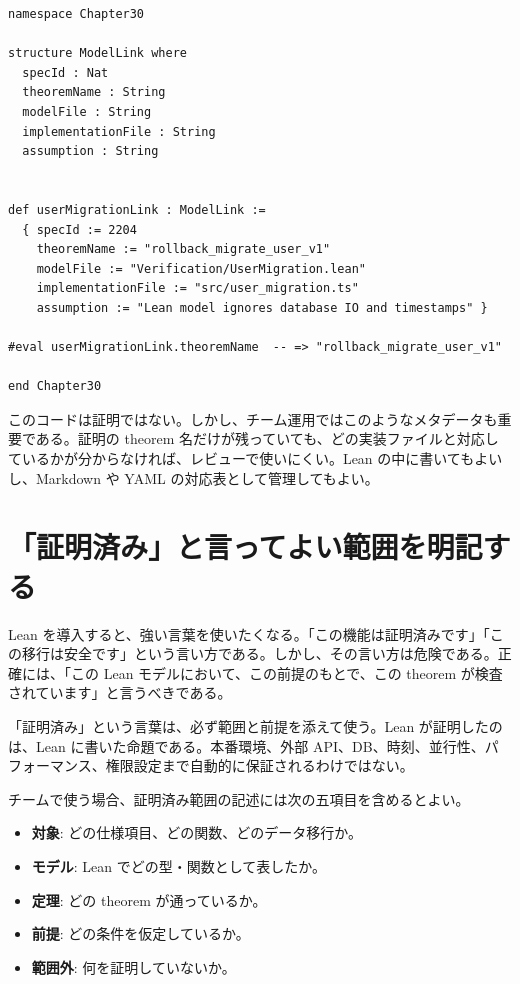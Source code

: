 \begin{listing}[htbp]
\begin{verbatim}
namespace Chapter30

structure ModelLink where
  specId : Nat
  theoremName : String
  modelFile : String
  implementationFile : String
  assumption : String


def userMigrationLink : ModelLink :=
  { specId := 2204
    theoremName := "rollback_migrate_user_v1"
    modelFile := "Verification/UserMigration.lean"
    implementationFile := "src/user_migration.ts"
    assumption := "Lean model ignores database IO and timestamps" }

#eval userMigrationLink.theoremName  -- => "rollback_migrate_user_v1"

end Chapter30
\end{verbatim}
\caption{検証モデルと実装ファイルの対応を表すメタデータ}
\label{lst:ch30-model-link}
\end{listing}

このコードは証明ではない。しかし、チーム運用ではこのようなメタデータも重要である。証明の theorem 名だけが残っていても、どの実装ファイルと対応しているかが分からなければ、レビューで使いにくい。Lean の中に書いてもよいし、Markdown や YAML の対応表として管理してもよい。

\section{「証明済み」と言ってよい範囲を明記する}

Lean を導入すると、強い言葉を使いたくなる。「この機能は証明済みです」「この移行は安全です」という言い方である。しかし、その言い方は危険である。正確には、「この Lean モデルにおいて、この前提のもとで、この theorem が検査されています」と言うべきである。

\begin{warningbox}
「証明済み」という言葉は、必ず範囲と前提を添えて使う。Lean が証明したのは、Lean に書いた命題である。本番環境、外部 API、DB、時刻、並行性、パフォーマンス、権限設定まで自動的に保証されるわけではない。
\end{warningbox}

チームで使う場合、証明済み範囲の記述には次の五項目を含めるとよい。

\begin{itemize}
\item \textbf{対象}: どの仕様項目、どの関数、どのデータ移行か。
\item \textbf{モデル}: Lean でどの型・関数として表したか。
\item \textbf{定理}: どの theorem が通っているか。
\item \textbf{前提}: どの条件を仮定しているか。
\item \textbf{範囲外}: 何を証明していないか。
\end{itemize}

